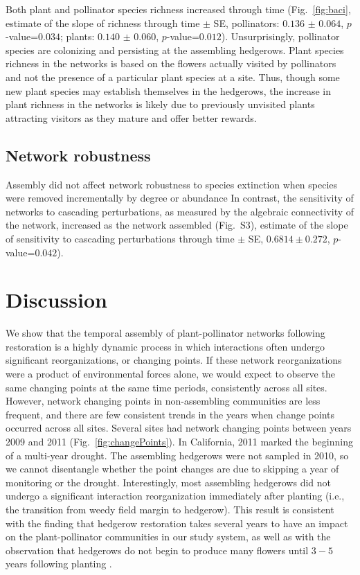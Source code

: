 \documentclass[12pt]{article}
\begin{document}
Both plant and pollinator species richness increased through time
(Fig.~\ref{fig:baci}, estimate of the slope of richness through time
$\pm$ SE, pollinators: $0.136$ $\pm$ $0.064$, $p$-value=$0.034$;
plants: $0.140$ $\pm$ $0.060$, $p$-value=$0.012$). Unsurprisingly,
pollinator species are colonizing and persisting at the assembling
hedgerows. Plant species richness in the networks is based on the
flowers actually visited by pollinators and not the presence of a
particular plant species at a site. Thus, though some new plant
species may establish themselves in the hedgerows, the increase in
plant richness in the networks is likely due to previously unvisited
plants attracting visitors as they mature and offer better rewards.

\subsection*{Network robustness}
Assembly did not affect network robustness to species
extinction when species were removed incrementally by
degree or abundance %
In contrast, the sensitivity of networks to cascading perturbations,
as measured by the algebraic connectivity of the network, increased as
the network assembled (Fig.~S3), estimate of the slope of
sensitivity to cascading perturbations through time $\pm$ SE, $0.6814
\pm 0.272$, $p$-value=$0.042$).

\section*{Discussion}
\label{sec:discussion}

We show that the temporal assembly of plant-pollinator networks
following restoration is a highly dynamic process in which
interactions often undergo significant reorganizations, or changing
points. If these network reorganizations were a product of
environmental forces alone, we would expect to observe the same
changing points at the same time periods, consistently across all
sites. However, network changing points in non-assembling communities
are less frequent, and there are few consistent trends in the years
when change points occurred across all sites. Several sites had
network changing points between years 2009 and 2011
(Fig.~\ref{fig:changePoints}). In California, 2011 marked the
beginning of a multi-year drought. The assembling hedgerows were not
sampled in 2010, so we cannot disentangle whether the point changes
are due to skipping a year of monitoring or the
drought. Interestingly, most assembling hedgerows did not undergo a
significant interaction reorganization immediately after planting
(i.e., the transition from weedy field margin to hedgerow). This
result is consistent with the finding that hedgerow restoration takes
several years to have an impact on the plant-pollinator communities in
our study system, as well as with the observation that hedgerows do
not begin to produce many flowers until $3-5$ years following planting
\citep{kremen-2015-602}.
\end{document}
